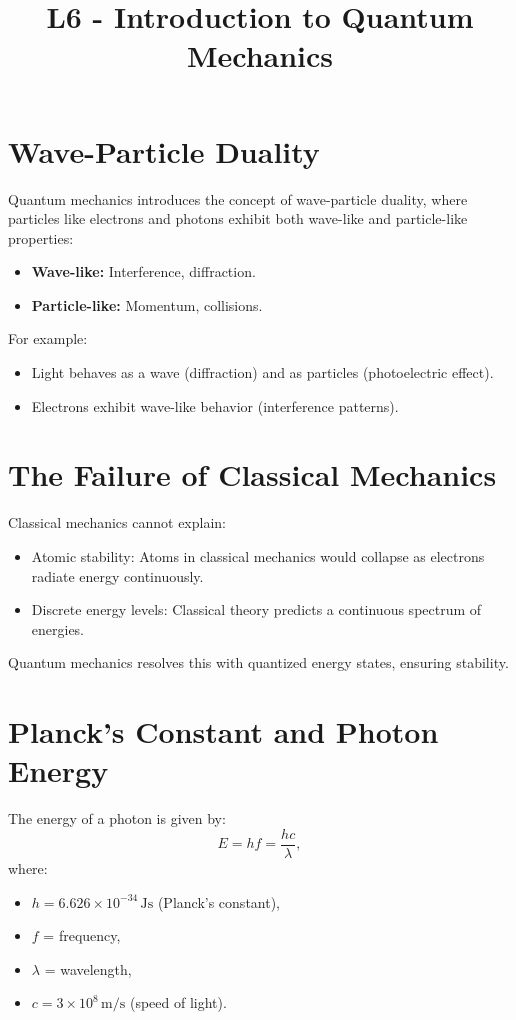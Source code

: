 \documentclass[a4paper,12pt]{article}
\begin{document}
\title{L6 - Introduction to Quantum Mechanics}
\author{}
\date{}
\maketitle
\begin{multicols}{2}

\section*{Wave-Particle Duality}
Quantum mechanics introduces the concept of wave-particle duality, where particles like electrons and photons exhibit both wave-like and particle-like properties:
\begin{itemize}
    \item \textbf{Wave-like:} Interference, diffraction.
    \item \textbf{Particle-like:} Momentum, collisions.
\end{itemize}

For example:
\begin{itemize}
    \item Light behaves as a wave (diffraction) and as particles (photoelectric effect).
    \item Electrons exhibit wave-like behavior (interference patterns).
\end{itemize}

\section*{The Failure of Classical Mechanics}
Classical mechanics cannot explain:
\begin{itemize}
    \item Atomic stability: Atoms in classical mechanics would collapse as electrons radiate energy continuously.
    \item Discrete energy levels: Classical theory predicts a continuous spectrum of energies.
\end{itemize}
Quantum mechanics resolves this with quantized energy states, ensuring stability.

\section*{Planck’s Constant and Photon Energy}
The energy of a photon is given by:
\[
E = hf = \frac{hc}{\lambda},
\]
where:
\begin{itemize}
    \item $h = 6.626 \times 10^{-34} \, \mathrm{Js}$ (Planck’s constant),
    \item $f$ = frequency,
    \item $\lambda$ = wavelength,
    \item $c = 3 \times 10^8 \, \mathrm{m/s}$ (speed of light).
\end{itemize}


\end{multicols}
\end{document}
